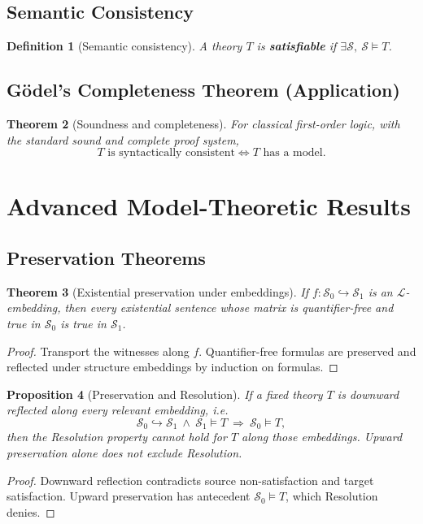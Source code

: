 \documentclass[11pt]{article}
\newtheorem{definition}{Definition}
\newtheorem{theorem}[definition]{Theorem}
\newtheorem{proposition}[definition]{Proposition}
\newcommand{\Sat}{\models}
\newcommand{\Emb}{\hookrightarrow}
\begin{document}
\subsection{Semantic Consistency}
\begin{definition}[Semantic consistency]
A theory $T$ is \textbf{satisfiable} if $\exists\mathcal S,\ \mathcal S\Sat T$.
\end{definition}
\subsection{G\"odel's Completeness Theorem (Application)}
\begin{theorem}[Soundness and completeness]
For classical first-order logic, with the standard sound and complete proof system,
\[
T\text{ is syntactically consistent}\iff
T\text{ has a model}.
\]
\end{theorem}

\section{Advanced Model-Theoretic Results}
\subsection{Preservation Theorems}
\begin{theorem}[Existential preservation under embeddings]
If $f:\mathcal S_0\Emb\mathcal S_1$ is an $\mathcal L$-embedding, then every existential sentence whose matrix is quantifier-free and true in $\mathcal S_0$ is true in $\mathcal S_1$.
\end{theorem}
\begin{proof}
Transport the witnesses along $f$. Quantifier-free formulas are preserved and reflected under structure embeddings by induction on formulas.
\end{proof}
\begin{proposition}[Preservation and Resolution]
If a fixed theory $T$ is downward reflected along every relevant embedding, i.e.
\[
\mathcal S_0\Emb\mathcal S_1\ \land\ \mathcal S_1\Sat T
\ \Longrightarrow\ \mathcal S_0\Sat T,
\]
then the Resolution property cannot hold for $T$ along those embeddings. Upward preservation alone does not exclude Resolution.
\end{proposition}
\begin{proof}
Downward reflection contradicts source non-satisfaction and target satisfaction. Upward preservation has antecedent $\mathcal S_0\Sat T$, which Resolution denies.
\end{proof}
\end{document}
